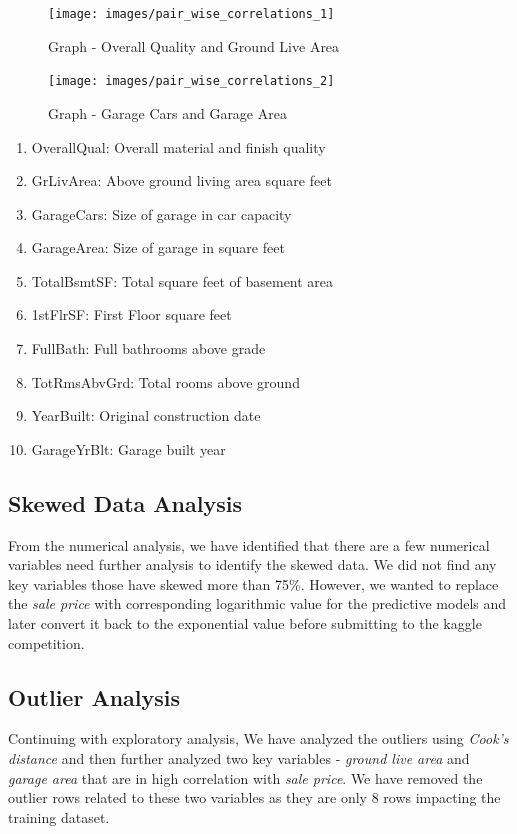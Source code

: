 \documentclass[sigconf]{acmart}
\begin{document}
	\begin{figure}[htb]
		\centering
		\texttt{[image: images/pair\_wise\_correlations\_1]}	
		\caption{Graph - Overall Quality and Ground Live Area} \label{fig:pair-wise-correlations} 
	\end{figure}

	\begin{figure}[htb]
	\centering
	\texttt{[image: images/pair\_wise\_correlations\_2]}	
	\caption{Graph - Garage Cars and Garage Area} \label{fig:pair-wise-correlations-2} 
	\end{figure}

	\begin{enumerate}
		\item OverallQual: Overall material and finish quality
		\item GrLivArea: Above ground living area square feet
		\item GarageCars: Size of garage in car capacity
		\item GarageArea: Size of garage in square feet
		\item TotalBsmtSF: Total square feet of basement area
		\item 1stFlrSF: First Floor square feet
		\item FullBath: Full bathrooms above grade
		\item TotRmsAbvGrd: Total rooms above ground
		\item YearBuilt: Original construction date
		\item GarageYrBlt: Garage built year		
	\end{enumerate}

	\subsection{Skewed Data Analysis}
	From the numerical analysis, we have identified that there are a few numerical variables need further analysis to identify the skewed data. We did not find any key variables those have skewed more than 75\%. However, we wanted to replace the {\em sale price} with corresponding logarithmic value for the predictive models and later convert it back to the exponential value before submitting to the kaggle competition. 
	
	\subsection{Outlier Analysis}
	
	Continuing with exploratory analysis, We have analyzed the outliers using {\em Cook's distance} and then further analyzed two key variables - {\em ground live area} and {\em garage area} that are in high correlation with {\em sale price}. We have removed the outlier rows related to these two variables as they are only 8 rows impacting the training dataset.
	
\end{document}
